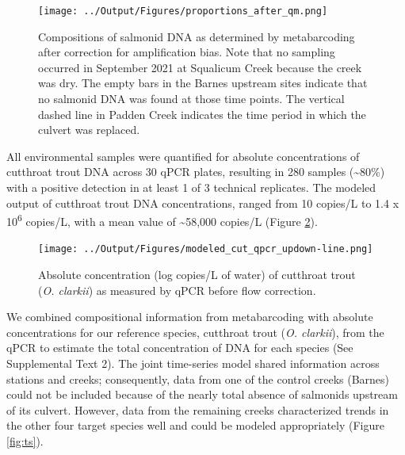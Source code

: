 \documentclass[
]{article}
\begin{document}
\begin{figure}
\centering
\texttt{[image: ../Output/Figures/proportions\_after\_qm.png]}
\caption{Compositions of salmonid DNA as determined by metabarcoding
after correction for amplification bias. Note that no sampling occurred
in September 2021 at Squalicum Creek because the creek was dry. The
empty bars in the Barnes upstream sites indicate that no salmonid DNA
was found at those time points. The vertical dashed line in Padden Creek
indicates the time period in which the culvert was
replaced.\label{fig:qm}}
\end{figure}

All environmental samples were quantified for absolute concentrations of
cutthroat trout DNA across 30 qPCR plates, resulting in 280 samples
(\textasciitilde80\%) with a positive detection in at least 1 of 3
technical replicates. The modeled output of cutthroat trout DNA
concentrations, ranged from 10 copies/L to 1.4 x 10\textsuperscript{6}
copies/L, with a mean value of \textasciitilde58,000 copies/L (Figure
\ref{fig:qpcr}).

\begin{figure}
\centering
\texttt{[image: ../Output/Figures/modeled\_cut\_qpcr\_updown-line.png]}
\caption{Absolute concentration (log copies/L of water) of cutthroat
trout (\emph{O. clarkii}) as measured by qPCR before flow
correction.\label{fig:qpcr}}
\end{figure}

We combined compositional information from metabarcoding with absolute
concentrations for our reference species, cutthroat trout (\emph{O.
clarkii}), from the qPCR to estimate the total concentration of DNA for
each species (See Supplemental Text 2). The joint time-series model
shared information across stations and creeks; consequently, data from
one of the control creeks (Barnes) could not be included because of the
nearly total absence of salmonids upstream of its culvert. However, data
from the remaining creeks characterized trends in the other four target
species well and could be modeled appropriately (Figure \ref{fig:ts}).
\end{document}
